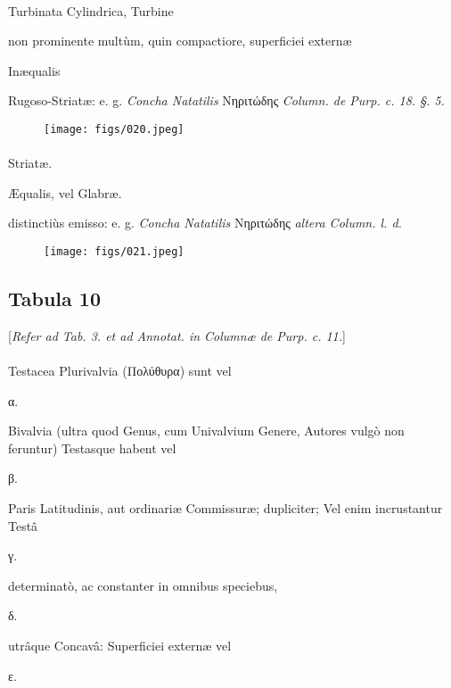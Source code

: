 \documentclass[a4paper, 11pt, oneside, polutonikogreek, german]{article}
\begin{document}
\paragraph{}
Turbinata Cylindrica, Turbine

non prominente multùm, quin compactiore, superficiei externæ

Inæqualis

Rugoso-Striatæ: e. g. \emph{Concha Natatilis} Νηριτώδης \emph{Column. de Purp. c. 18. §. 5.}

\begin{figure}[H]
\centering
\texttt{[image: figs/020.jpeg]}
\end{figure}
\paragraph{}
Striatæ.

Æqualis, vel Glabræ.

distinctiùs emisso: e. g. \emph{Concha Natatilis} Νηριτώδης \emph{altera Column. l. d.}

\begin{figure}[H]
\centering
\texttt{[image: figs/021.jpeg]}
\end{figure}
\clearpage
\subsection{Tabula 10}
\begin{center}
[\emph{Refer ad Tab. 3. et ad Annotat. in Columnæ de Purp. c. 11.}]
\end{center}
\paragraph{}
Testacea Plurivalvia (Πολύθυρα) sunt vel

α.

Bivalvia (ultra quod Genus, cum Univalvium Genere, Autores vulgò non feruntur) Testasque habent vel

β.

Paris Latitudinis, aut ordinariæ Commissuræ; dupliciter; Vel enim incrustantur Testâ

γ.

determinatò, ac constanter in omnibus speciebus,

δ.

utrâque Concavâ: Superficiei externæ vel

ε.
\end{document}
